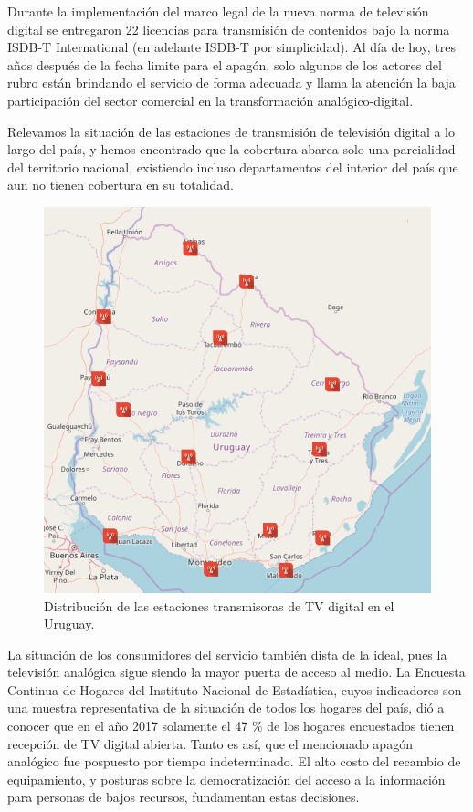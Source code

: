 Durante la implementación del marco legal de la nueva norma de televisión digital se entregaron 22 licencias para transmisión de contenidos bajo la norma ISDB-T International (en adelante ISDB-T por simplicidad). Al día de hoy, tres años después de la fecha limite para el apagón, solo algunos de los actores del rubro están brindando el servicio de forma adecuada y llama la atención la baja participación del sector comercial en la transformación analógico-digital. 

Relevamos la situación de las estaciones de transmisión de televisión digital a lo largo del país, y hemos encontrado que la cobertura abarca solo una parcialidad del territorio nacional, existiendo incluso departamentos del interior del país que aun no tienen cobertura en su totalidad.

\begin{figure}
	\centering
	\includegraphics[scale=0.3]{figuras/cap01/mapa_estaciones}
	\caption{\label{mapa_estaciones} Distribución de las estaciones transmisoras de TV digital en el Uruguay.}
\end{figure}

La situación de los consumidores del servicio también dista de la ideal, pues la televisión analógica sigue siendo la mayor puerta de acceso al medio. La Encuesta Continua de Hogares del Instituto Nacional de Estadística\cite{ine2017}, cuyos indicadores son una muestra representativa de la situación de todos los hogares del país, dió a conocer que en el año 2017 solamente el 47 \% de los hogares encuestados tienen recepción de TV digital abierta. Tanto es así, que el mencionado apagón analógico fue pospuesto por tiempo indeterminado. El alto costo del recambio de equipamiento, y posturas sobre la democratización del acceso a la información para personas de bajos recursos, fundamentan estas decisiones.

